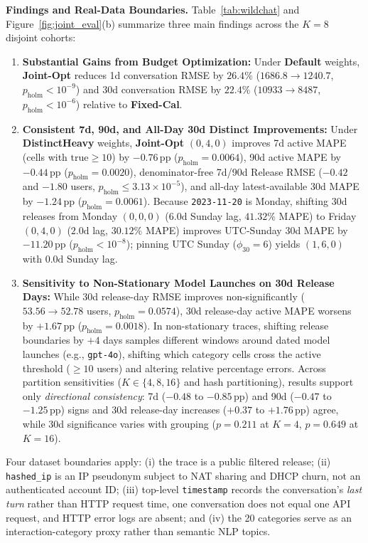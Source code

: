 \documentclass[sigconf, nonacm]{acmart}
\begin{document}
\textbf{Findings and Real-Data Boundaries.} Table~\ref{tab:wildchat} and Figure~\ref{fig:joint_eval}(b) summarize three main findings across the $K=8$ disjoint cohorts:
\begin{enumerate}[leftmargin=*, nosep, topsep=2pt]
    \item \textbf{Substantial Gains from Budget Optimization:} Under \textbf{Default} weights, \textbf{Joint-Opt} reduces 1d conversation RMSE by $26.4\%$ ($1686.8 \to 1240.7$, $p_{\mathrm{holm}} < 10^{-9}$) and 30d conversation RMSE by $22.4\%$ ($10933 \to 8487$, $p_{\mathrm{holm}} < 10^{-6}$) relative to \textbf{Fixed-Cal}.
    \item \textbf{Consistent 7d, 90d, and All-Day 30d Distinct Improvements:} Under \textbf{DistinctHeavy} weights, \textbf{Joint-Opt} $(0,4,0)$ improves 7d active MAPE (cells with $\mathrm{true} \ge 10$) by $-0.76\,\text{pp}$ ($p_{\mathrm{holm}}=0.0064$), 90d active MAPE by $-0.44\,\text{pp}$ ($p_{\mathrm{holm}}=0.0020$), denominator-free 7d/90d Release RMSE ($-0.42$ and $-1.80$ users, $p_{\mathrm{holm}} \le 3.13\times 10^{-5}$), and all-day latest-available 30d MAPE by $-1.24\,\text{pp}$ ($p_{\mathrm{holm}}=0.0061$). Because \texttt{2023-11-20} is Monday, shifting 30d releases from Monday $(0,0,0)$ ($6.0\text{d}$ Sunday lag, $41.32\%$ MAPE) to Friday $(0,4,0)$ ($2.0\text{d}$ lag, $30.12\%$ MAPE) improves UTC-Sunday 30d MAPE by $-11.20\,\text{pp}$ ($p_{\mathrm{holm}} < 10^{-8}$); pinning UTC Sunday ($\phi_{30}=6$) yields $(1,6,0)$ with $0.0\text{d}$ Sunday lag.
    \item \textbf{Sensitivity to Non-Stationary Model Launches on 30d Release Days:} While 30d release-day RMSE improves non-significantly ($53.56 \to 52.78$ users, $p_{\mathrm{holm}}=0.0574$), 30d release-day active MAPE worsens by $+1.67\,\text{pp}$ ($p_{\mathrm{holm}}=0.0018$). In non-stationary traces, shifting release boundaries by $+4$ days samples different windows around dated model launches (e.g., \texttt{gpt-4o}), shifting which category cells cross the active threshold ($\ge 10$ users) and altering relative percentage errors. Across partition sensitivities ($K \in \{4, 8, 16\}$ and hash partitioning), results support only \emph{directional consistency}: 7d ($-0.48$ to $-0.85\,\text{pp}$) and 90d ($-0.47$ to $-1.25\,\text{pp}$) signs and 30d release-day increases ($+0.37$ to $+1.76\,\text{pp}$) agree, while 30d significance varies with grouping ($p=0.211$ at $K=4$, $p=0.649$ at $K=16$).
\end{enumerate}

Four dataset boundaries apply: (i) the trace is a public filtered release; (ii) \texttt{hashed\_ip} is an IP pseudonym subject to NAT sharing and DHCP churn, not an authenticated account ID; (iii) top-level \texttt{timestamp} records the conversation's \emph{last turn} rather than HTTP request time, one conversation does not equal one API request, and HTTP error logs are absent; and (iv) the 20 categories serve as an interaction-category proxy rather than semantic NLP topics.
\end{document}
